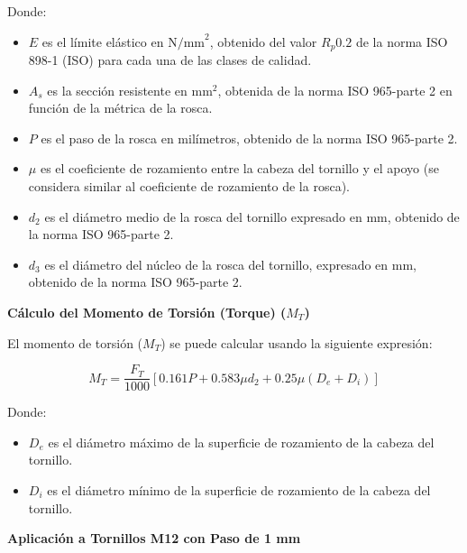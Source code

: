 \documentclass[14pt,oneside]{extarticle} %
\begin{document}
Donde:
\begin{itemize}
    \item \( E \) es el límite elástico en \( \text{N/mm}^2 \), obtenido del valor \( R_p 0.2 \) de la norma ISO 898-1 (ISO) para cada una de las clases de calidad.
    \item \( A_s \) es la sección resistente en \( \text{mm}^2 \), obtenida de la norma ISO 965-parte 2 en función de la métrica de la rosca.
    \item \( P \) es el paso de la rosca en milímetros, obtenido de la norma ISO 965-parte 2.
    \item \( \mu \) es el coeficiente de rozamiento entre la cabeza del tornillo y el apoyo (se considera similar al coeficiente de rozamiento de la rosca).
    \item \( d_2 \) es el diámetro medio de la rosca del tornillo expresado en mm, obtenido de la norma ISO 965-parte 2.
    \item \( d_3 \) es el diámetro del núcleo de la rosca del tornillo, expresado en mm, obtenido de la norma ISO 965-parte 2.
\end{itemize}

\textbf{Cálculo del Momento de Torsión (Torque) (\( M_T \))}

El momento de torsión (\( M_T \)) se puede calcular usando la siguiente expresión:

\begin{equation} \label{eq:MT}
M_T = \frac{F_T}{1000} \left[ 0.161 P + 0.583 \mu d_2 + 0.25 \mu (D_e + D_i) \right]
\end{equation}

\newpage

Donde:

\begin{itemize}
    \item \( D_e \) es el diámetro máximo de la superficie de rozamiento de la cabeza del tornillo.
    \item \( D_i \) es el diámetro mínimo de la superficie de rozamiento de la cabeza del tornillo.
\end{itemize}

\textbf{Aplicación a Tornillos M12 con Paso de 1 mm}
\end{document}
